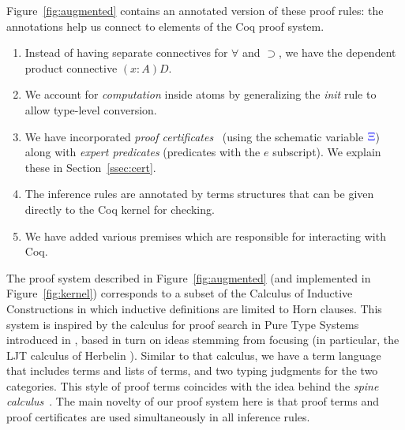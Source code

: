 Figure~\ref{fig:augmented} contains an annotated version of these
proof rules: the annotations help us connect to elements of the Coq
proof system.
\begin{enumerate}
  \item Instead of having separate connectives for $\forall$ and
    $\supset$, we have the dependent product connective $(x:A)D$. 
  \item We account for \emph{computation} inside atoms by generalizing
    the \emph{init} rule to allow type-level conversion.
  \item We have incorporated  \emph{proof
  certificates}~\cite{chihani17jar} (using the schematic variable
    ${\color{blue}{\Xi}}$) along with \emph{expert predicates} (predicates with the $e$
    subscript). We explain these in Section~\ref{ssec:cert}.
  \item The inference rules are  annotated by terms structures that
    can be given directly to the Coq kernel for checking.
  \item We have added various premises which are responsible for
    interacting with Coq.
\end{enumerate}
The proof system described in Figure~\ref{fig:augmented} (and
implemented in Figure~\ref{fig:kernel}) corresponds to a subset of the Calculus
of Inductive Constructions in which inductive definitions are
limited to %
Horn clauses.
%
This  system is inspired by the calculus for proof search in
Pure Type Systems introduced in \cite{LengrandDM06}, based in turn on
ideas stemming from focusing (in particular, the LJT calculus of
Herbelin \cite{Herbelin94}). Similar to that calculus, we have a
term language that includes terms and lists of terms, and two %
typing judgments for the two categories.
%
This style of  proof terms coincides with the idea behind the \emph{spine
  calculus}~\cite{Cervesato97tr}.  The main novelty of our proof
system here is that proof terms and proof certificates are used
simultaneously in all inference rules.

